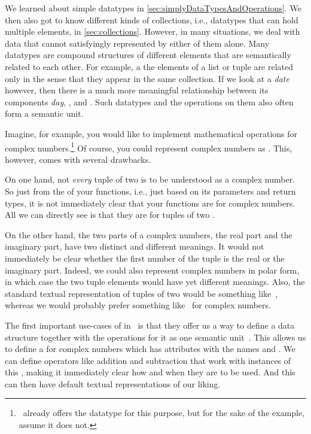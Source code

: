 %
%
We learned about simple datatypes in \cref{sec:simplyDataTypesAndOperations}.
We then also got to know different kinds of collections, i.e., datatypes that can hold multiple elements, in \cref{sec:collections}.
However, in many situations, we deal with data that cannot satisfyingly represented by either of them alone.
Many datatypes are compound structures of different elements that are semantically related to each other.
For example, a the elements of a list or tuple are related only in the sense that they appear in the same collection.
If we look at a \emph{date} however, then there is a much more meaningful relationship between its components \emph{day}, , and .
Such datatypes and the operations on them also often form a semantic unit.

Imagine, for example, you would like to implement mathematical operations for complex numbers.\footnote{%
\python\ already offers the datatype  for this purpose, but for the sake of the example, assume it does not.}
Of course, you could represent complex numbers as .
This, however, comes with several drawbacks.

On one hand, not \emph{every} tuple of two  is to be understood as a complex number.
So just from the  of your functions, i.e., just based on its parameters and return types, it is not immediately clear that your functions are for complex numbers.
All we can directly see is that they are for tuples of two .

On the other hand, the two parts of a complex numbers, the real part and the imaginary part, have two distinct and different meanings.
It would not immediately be clear whether the first number of the tuple is the real or the imaginary part.
Indeed, we could also represent complex numbers in polar form, in which case the two tuple elements would have yet different meanings.
Also, the standard textual representation of tuples of two  would be something like~, whereas we would probably prefer something like~ for complex numbers.

The first important use-cases of  in \python\ is that they offer us a way to define a data structure together with the operations for it as one semantic unit~\cite{PSF:P3D:TPT:C}.
This allows us to define a  for complex numbers which has attributes with the names  and .
We can define operators like addition and subtraction that work with instances of this , making it immediately clear how and when they are to be used.
And this  can then have default textual representations of our liking.

